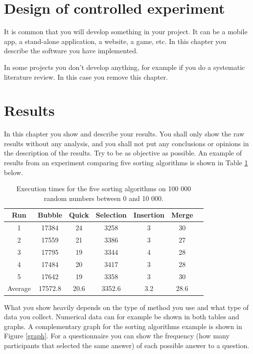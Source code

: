 \documentclass[a4paper,12pt]{article}
\begin{document}
\section{Design of controlled experiment}
It is common that you will develop something in your project. It can be a mobile app, a stand-alone application, a website, a game, etc. In this chapter you describe the software you have implemented. 

In some projects you don't develop anything, for example if you do a systematic literature review. In this case you remove this chapter.

\newpage

\section{Results}
In this chapter you show and describe your results. You shall only show the raw results without any analysis, and you shall not put any conclusions or opinions in the description of the results. Try to be as objective as possible. An example of results from an experiment comparing five sorting algorithms is shown in Table \ref{results} below.\\



\begin{center}
\begin{table}[ht]
\begin{center}
\begin{tabular}{ccccccc}
\hline
Run & Bubble & Quick & Selection & Insertion & Merge \\
\hline
1 & 17384 & 24 & 3258 & 3 & 30 \\
2 & 17559 & 21 & 3386 & 3 & 27 \\
3 & 17795 & 19 & 3344 & 4 & 28 \\
4 & 17484 & 20 & 3417 & 3 & 28 \\
5 & 17642 & 19 & 3358 & 3 & 30 \\
\hline
Average & 17572.8 & 20.6 & 3352.6 & 3.2 & 28.6 \\
\hline
%
\end{tabular}
\end{center}
\caption{Execution times for the five sorting algorithms on 100 000 random numbers between 0 and 10 000.}
\label{results}
\end{table}
\end{center}

What you show heavily depends on the type of method you use and what type of data you collect. Numerical data can for example be shown in both tables and graphs. A complementary graph for the sorting algorithms example is shown in Figure \ref{graph}. For a questionnaire you can show the frequency (how many participants that selected the same answer) of each possible answer to a question.
\end{document}
